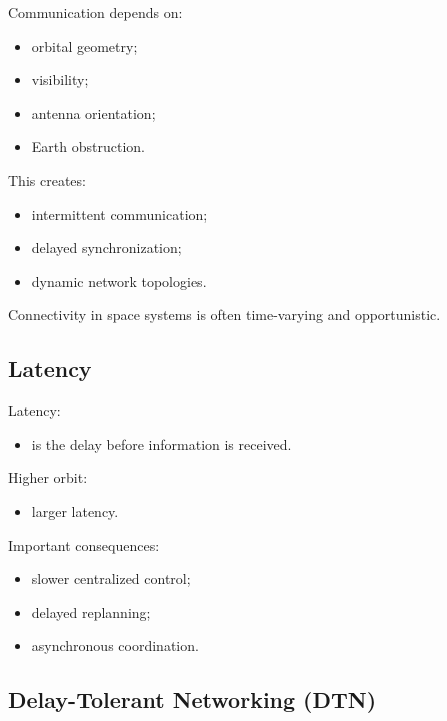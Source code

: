 \documentclass[10pt,a4paper,twocolumn]{article}
\begin{document}
Communication depends on:
\begin{itemize}
    \item orbital geometry;
    \item visibility;
    \item antenna orientation;
    \item Earth obstruction.
\end{itemize}

This creates:
\begin{itemize}
    \item intermittent communication;
    \item delayed synchronization;
    \item dynamic network topologies.
\end{itemize}

\begin{keybox}
    Connectivity in space systems is often time-varying and opportunistic.
\end{keybox}


\subsection{Latency}

Latency:
\begin{itemize}
    \item is the delay before information is received.
\end{itemize}

Higher orbit:
\begin{itemize}
    \item larger latency.
\end{itemize}

Important consequences:
\begin{itemize}
    \item slower centralized control;
    \item delayed replanning;
    \item asynchronous coordination.
\end{itemize}


\subsection{Delay-Tolerant Networking (DTN)}
\end{document}
